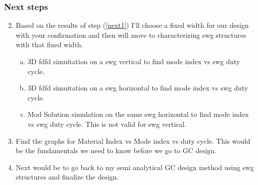 \documentclass{beamer}
\begin{document}
\begin{frame}
\frametitle{Next steps}
\begin{enumerate}
\setcounter{enumi}{1}
\item Based on the results of step (\ref{next1}) I'll choose a fixed width for our design with your confirmation and then will move to characterizing swg structures with that fixed width.
\begin{enumerate}[(a)]
\item 3D fdfd simuitation on a  swg vertical to find mode index vs swg duty cycle.
\item 3D fdfd simuitation on a  swg horizontal to find mode index vs swg duty cycle. 
\item Mod Solution simulation on the same swg horizontal to find mode index vs swg duty cycle. This is not valid for swg vertical.
\end{enumerate}
\item Find the graphs for Material Index vs Mode index vs duty cycle. This would be the fundamentals we need to know before we go to GC design.
\item Next would be to go back to my semi analytical GC design method using swg structures and finalize the design.
\end{enumerate}
\end{frame}
%
\end{document}
